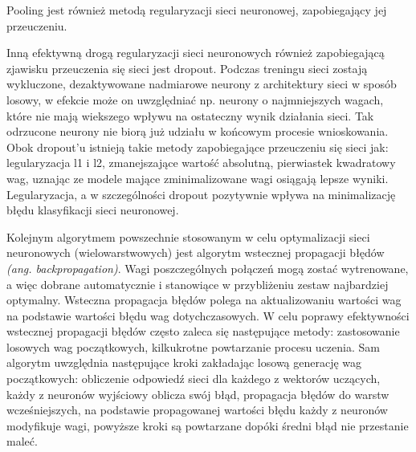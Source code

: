 \documentclass[a4paper,12pt]{article}
\begin{document}
        Pooling jest również metodą regularyzacji sieci neuronowej, zapobiegający jej przeuczeniu. 
        
        \par 
        Inną efektywną drogą regularyzacji sieci neuronowych również zapobiegającą zjawisku przeuczenia się sieci jest dropout. 
        Podczas treningu sieci zostają wykluczone, dezaktywowane nadmiarowe neurony z architektury sieci w sposób losowy, w efekcie może on uwzględniać np. neurony o najmniejszych wagach, które nie mają wiekszego wpływu na ostateczny wynik działania sieci. Tak odrzucone neurony nie biorą już udziału w końcowym procesie wnioskowania. Obok dropout'u istnieją takie metody zapobiegające przeuczeniu się sieci jak: legularyzacja l1 i l2, zmanejszające wartość absolutną, pierwiastek kwadratowy wag, uznając ze modele mające zminimalizowane wagi osiągają lepsze wyniki. Legularyzacja, a w szczególności dropout pozytywnie wpływa na minimalizację błędu klasyfikacji sieci neuronowej. 
        
	    Kolejnym algorytmem powszechnie stosowanym w celu optymalizacji sieci neuronowych (wielowarstwowych) jest algorytm wstecznej propagacji błędów \textit{(ang. backpropagation)}. Wagi poszczególnych połączeń mogą zostać wytrenowane, a więc dobrane automatycznie i stanowiące w przybliżeniu zestaw najbardziej optymalny. Wsteczna propagacja błędów polega na aktualizowaniu wartości wag na podstawie wartości błędu wag dotychczasowych. W celu poprawy efektywności wstecznej propagacji błędów często zaleca się następujące metody: 
        zastosowanie losowych wag początkowych, kilkukrotne powtarzanie procesu uczenia. Sam algorytm uwzględnia następujące kroki zakładając losową generację wag początkowych: obliczenie odpowiedź sieci dla każdego z wektorów uczących, każdy z neuronów wyjściowy oblicza swój błąd, propagacja błędów do warstw wcześniejszych, na podstawie propagowanej wartości błędu każdy z neuronów modyfikuje wagi, powyższe kroki są powtarzane dopóki średni błąd nie przestanie maleć.
\end{document}
